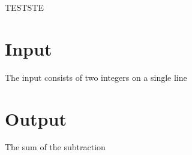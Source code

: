 
TESTSTE

\section*{Input}

The input consists of two integers on a single line

\section*{Output}

The sum of the subtraction